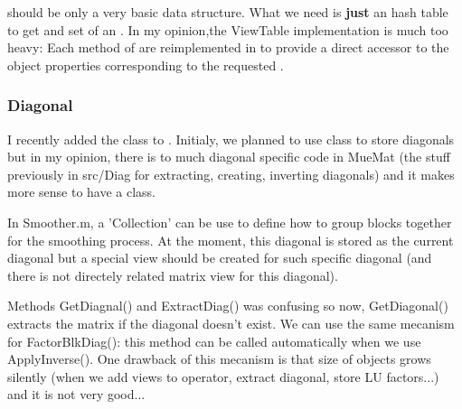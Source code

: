 \begin{remark}
\ViewTable should be only a very basic data structure. What we need is \textbf{just} an hash table to get and set \View of an \Operator.
In my opinion,the ViewTable implementation is much too heavy: Each method of \oldSingleViewOperator are
reimplemented in \ViewTable to provide a direct accessor to the \oldSingleViewOperator object properties corresponding to the requested \View.
\end{remark}

\subsubsection{Diagonal}
  
\begin{remark}
I recently added the \Diagonal class to \muemat. Initialy, we planned to use \oldSingleViewOperator class to store diagonals but 
in my opinion, there is to much diagonal specific code in MueMat (the stuff previously in src/Diag for extracting, creating, inverting diagonals) and it makes more sense to have a \Diagonal class.
\end{remark}

\begin{remark}
In Smoother.m, a 'Collection' can be use to define how to group blocks together for the smoothing process.
At the moment, this diagonal is stored as the current diagonal but a special view should be created for such specific diagonal (and there is not directely related matrix view for this diagonal).
\end{remark}

\begin{remark}
Methods GetDiagnal() and ExtractDiag() was confusing so now, GetDiagonal() extracts the matrix if the diagonal doesn't exist. We can use the same mecanism for FactorBlkDiag(): this method can be called automatically when we use ApplyInverse().
One drawback of this mecanism is that size of objects grows silently (when we add views to operator, extract diagonal, store LU factors...) and it is not very good... 
\end{remark}


